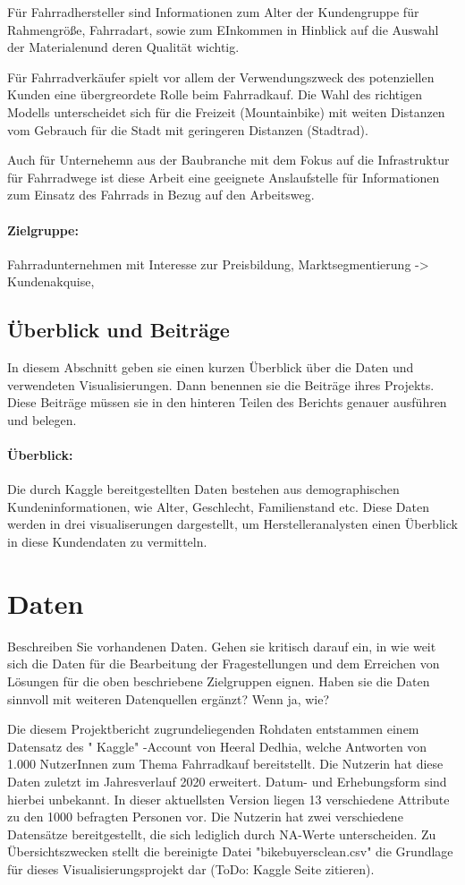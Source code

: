 \documentclass[usegeometry=true]{scrartcl}
\begin{document}
Für Fahrradhersteller sind Informationen zum Alter der Kundengruppe für Rahmengröße, Fahrradart, sowie zum EInkommen in Hinblick auf die Auswahl der Materialenund deren Qualität wichtig. 

Für Fahrradverkäufer spielt vor allem der Verwendungszweck des potenziellen Kunden eine übergreordete Rolle beim Fahrradkauf. Die Wahl des richtigen Modells unterscheidet sich für die Freizeit (Mountainbike) mit weiten Distanzen vom Gebrauch für die Stadt mit geringeren Distanzen (Stadtrad). 

Auch für Unternehemn aus der Baubranche mit dem Fokus auf die Infrastruktur für Fahrradwege ist diese Arbeit eine geeignete Anslaufstelle für Informationen zum Einsatz des Fahrrads in Bezug auf den Arbeitsweg. 


\paragraph{Zielgruppe:}Fahrradunternehmen mit Interesse zur Preisbildung, Marktsegmentierung -> Kundenakquise, 
\subsection{Überblick und Beiträge}
In diesem Abschnitt geben sie einen kurzen Überblick über die Daten und verwendeten Visualisierungen. Dann benennen sie die Beiträge ihres Projekts. Diese Beiträge müssen sie in den hinteren Teilen des Berichts genauer ausführen und belegen.
\paragraph{Überblick:}
Die durch Kaggle bereitgestellten Daten bestehen aus demographischen Kundeninformationen, wie Alter, Geschlecht, Familienstand etc. Diese Daten werden in drei visualiserungen dargestellt, um Herstelleranalysten einen Überblick in diese Kundendaten zu vermitteln.

\section{Daten}
Beschreiben Sie vorhandenen Daten. Gehen sie kritisch darauf ein, in wie weit sich die Daten für die Bearbeitung der Fragestellungen und dem Erreichen von Lösungen für die oben beschriebene Zielgruppen eignen. Haben sie die Daten sinnvoll mit weiteren Datenquellen ergänzt? Wenn ja, wie?

Die diesem Projektbericht zugrundeliegenden Rohdaten entstammen einem Datensatz des " Kaggle" -Account von Heeral Dedhia, welche Antworten von 1.000 NutzerInnen zum Thema Fahrradkauf bereitstellt. Die Nutzerin hat diese Daten zuletzt im Jahresverlauf 2020 erweitert. Datum- und Erhebungsform sind hierbei unbekannt. In dieser aktuellsten Version liegen 13 verschiedene Attribute zu den 1000 befragten Personen vor. Die Nutzerin hat zwei verschiedene Datensätze bereitgestellt, die sich lediglich durch NA-Werte unterscheiden. Zu Übersichtszwecken stellt die bereinigte Datei "bikebuyersclean.csv" die Grundlage für dieses Visualisierungsprojekt dar (ToDo: Kaggle Seite zitieren). 
\end{document}
